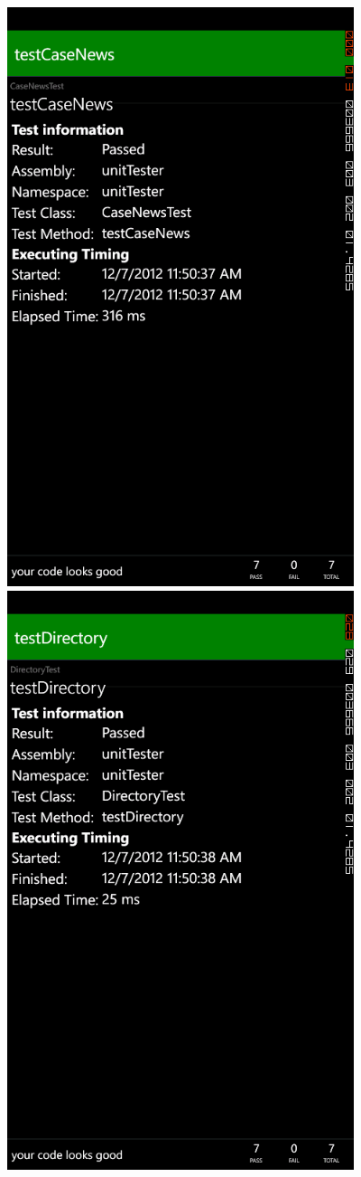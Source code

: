 \documentclass[pdftex,12pt,letter]{article}
\begin{document}
\FloatBarrier
\includegraphics[width=4in]{ss4.png}
\FloatBarrier
\includegraphics[width=4in]{ss5.png}
\end{document}
